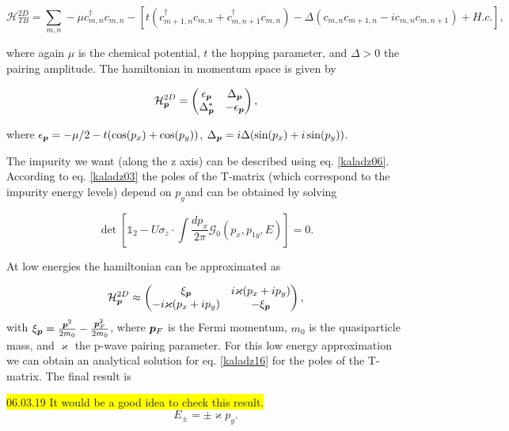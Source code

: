 \begin{equation}
    \mathcal{H}_{TB}^{2D} = \sum_{m,n} - \mu c^\dagger_{m,n} c_{m,n} - \left[t\left(c^\dagger_{m+1,n}c_{m,n} + c^\dagger_{m,n+1}c_{m,n}\right) - \Delta(c_{m,n}c_{m+1,n} - i c_{m,n}c_{m,n+1}) + H.c. \right],
\end{equation}

where again $\mu$ is the chemical potential, $t$ the hopping parameter, and $\Delta > 0$ the pairing amplitude. The hamiltonian in momentum space is given by

\begin{equation}
    \mathcal{H}_{\boldsymbol{p}}^{2D} = \begin{pmatrix} \epsilon_{\boldsymbol{p}} & \Delta_{\boldsymbol{p}} \\ \Delta_{\boldsymbol{p}}^* & - \epsilon_{\boldsymbol{p}}
    \end{pmatrix},
\end{equation}

where $\epsilon_{\boldsymbol{p}}= -\mu/2 - t(\cos(p_x) + \cos(p_y))$, $\Delta_{\boldsymbol{p}} = i\Delta(\sin(p_x) + i\sin(p_y))$.

The impurity we want (along the z axis) can be described using eq. \ref{kaladz06}. According to eq. \ref{kaladz03} the poles of the T-matrix (which correspond to the impurity energy levels) depend on $p_y$and can be obtained by solving

\begin{equation}
    \det \left[ \mathbb{1}_2 - U\sigma_z \cdot \int \frac{dp_x}{2\pi}\mathcal{G}_0(p_x,p_{1y},E)\right] =0.
    \label{kaladz16}
\end{equation}

At low energies the hamiltonian can be approximated as

\begin{equation}
    \mathcal{H}_{\boldsymbol{p}}^{2D} \approx \begin{pmatrix} \xi_{\boldsymbol{p}} & i\varkappa (p_x + ip_y) \\ -i\varkappa (p_x + ip_y) &  -\xi_{\boldsymbol{p}} \end{pmatrix},
\end{equation}
with $\xi_{\boldsymbol{p}} = \frac{\boldsymbol{p}^2}{2m_0} - \frac{\boldsymbol{p}_F^2}{2m_0}$, where $\boldsymbol{p}_F$ is the Fermi momentum, $m_0$ is the quasiparticle mass, and $\varkappa$ the p-wave pairing parameter. For this low energy approximation we can obtain an analytical solution for eq. \ref{kaladz16} for the poles of the T-matrix. The final result is 

\colorbox{yellow}{06.03.19 It would be a good idea to check this result.}
\begin{equation}
    E_\pm = \pm \varkappa p_y.
\end{equation}

